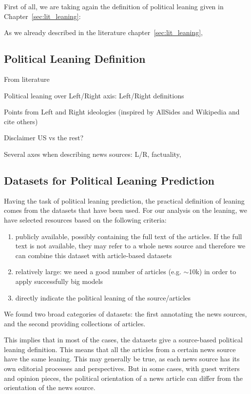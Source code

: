 First of all, we are taking again the definition of political leaning given in Chapter~\ref{sec:lit_leaning}: 

As we already described in the literature chapter~\ref{sec:lit_leaning}, 

\subsection{\statusred Political Leaning Definition}
\label{ssec:ps_leaning_def}

From literature

Political leaning over Left/Right axis: Left/Right definitions

Points from Left and Right ideologies (inspired by AllSides and Wikipedia and cite others) 

Disclaimer US vs the rest?

Several axes when describing news sources: L/R, factuality, 

\subsection{\statusgreen Datasets for Political Leaning Prediction}
\label{ssec:ps_leaning_data}

Having the task of political leaning prediction, the practical definition of leaning comes from the datasets that have been used.
For our analysis on the leaning, we have selected resources based on the following criteria:

\begin{enumerate}
    \item publicly available, possibly containing the full text of the articles. If the full text is not available, they may refer to a whole news source and therefore we can combine this dataset with article-based datasets
    \item relatively large: we need a good number of articles (e.g. $\sim$10k) in order to apply successfully big models 
    \item directly indicate the political leaning of the source/articles
\end{enumerate}

We found two broad categories of datasets: the first annotating the news sources, and the second providing collections of articles.

This implies that in most of the cases, the datasets give a source-based political leaning definition. This means that all the articles from a certain news source have the same leaning.
This may generally be true, as each news source has its own editorial processes and perspectives. But in some cases, with guest writers and opinion pieces, the political orientation of a news article can differ from the orientation of the news source.

